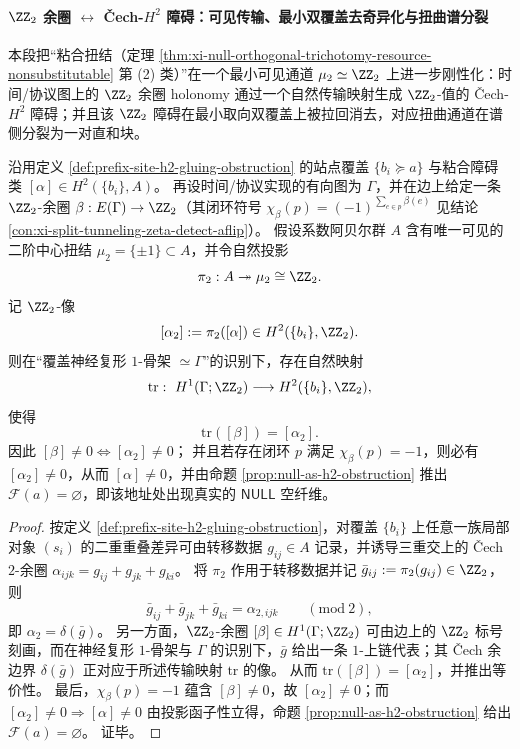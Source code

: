 
\paragraph{\texorpdfstring{$\ZZ_2$}{Z/2} 余圈 \texorpdfstring{$\leftrightarrow$}{<->} Čech-\texorpdfstring{$H^2$}{H2} 障碍：可见传输、最小双覆盖去奇异化与扭曲谱分裂}\label{par:xi-null-z2-cech-transfer-doublecover}
本段把“粘合扭结（定理 \ref{thm:xi-null-orthogonal-trichotomy-resource-nonsubstitutable} 第 (2) 类）”在一个最小可见通道 \(\mu_2\simeq\ZZ_2\) 上进一步刚性化：时间/协议图上的 \(\ZZ_2\) 余圈 holonomy 通过一个自然传输映射生成 \(\ZZ_2\)-值的 Čech-\(H^2\) 障碍；并且该 \(\ZZ_2\) 障碍在最小取向双覆盖上被拉回消去，对应扭曲通道在谱侧分裂为一对直和块。

\begin{theorem}\label{thm:xi-null-z2-cech-transfer-bockstein}
沿用定义 \ref{def:prefix-site-h2-gluing-obstruction} 的站点覆盖 \(\{b_i\succeq a\}\) 与粘合障碍类 \([\alpha]\in H^2(\{b_i\},A)\)。
再设时间/协议实现的有向图为 \(\Gamma\)，并在边上给定一条 \(\ZZ_2\)-余圈 \(\beta:E(\Gamma)\to\ZZ_2\)（其闭环符号
\(\chi_\beta(p)=(-1)^{\sum_{e\in p}\beta(e)}\)
见结论 \ref{con:xi-split-tunneling-zeta-detect-aflip}）。
假设系数阿贝尔群 \(A\) 含有唯一可见的二阶中心扭结 \(\mu_2=\{\pm1\}\subset A\)，并令自然投影
\[
\pi_2:A\twoheadrightarrow \mu_2\cong \ZZ_2.
\]
记 \(\ZZ_2\)-像
\[
[\alpha_2]:=\pi_2([\alpha])\in H^2(\{b_i\},\ZZ_2).
\]
则在“覆盖神经复形 \(1\)-骨架 \(\simeq \Gamma\)”的识别下，存在自然映射
\[
\mathrm{tr}:\ H^1(\Gamma;\ZZ_2)\longrightarrow H^2(\{b_i\},\ZZ_2),
\]
使得
\[
\mathrm{tr}([\beta])=[\alpha_2].
\]
因此
\(
[\beta]\neq 0 \iff [\alpha_2]\neq 0
\)；
并且若存在闭环 \(p\) 满足 \(\chi_\beta(p)=-1\)，则必有 \([\alpha_2]\neq 0\)，从而 \([\alpha]\neq 0\)，并由命题 \ref{prop:null-as-h2-obstruction} 推出 \(\mathscr{F}(a)=\varnothing\)，即该地址处出现真实的 \(\mathsf{NULL}\) 空纤维。
\end{theorem}

\begin{proof}
按定义 \ref{def:prefix-site-h2-gluing-obstruction}，对覆盖 \(\{b_i\}\) 上任意一族局部对象 \((s_i)\) 的二重重叠差异可由转移数据 \(g_{ij}\in A\) 记录，并诱导三重交上的 Čech \(2\)-余圈
\(
\alpha_{ijk}=g_{ij}+g_{jk}+g_{ki}
\)。
将 \(\pi_2\) 作用于转移数据并记 \(\bar g_{ij}:=\pi_2(g_{ij})\in\ZZ_2\)，则
\[
\bar g_{ij}+\bar g_{jk}+\bar g_{ki}=\alpha_{2,ijk}\qquad(\mathrm{mod}\ 2),
\]
即 \(\alpha_2=\delta(\bar g)\)。
另一方面，\(\ZZ_2\)-余圈 \([\beta]\in H^1(\Gamma;\ZZ_2)\) 可由边上的 \(\ZZ_2\) 标号刻画，而在神经复形 \(1\)-骨架与 \(\Gamma\) 的识别下，\(\bar g\) 给出一条 \(1\)-上链代表；其 Čech 余边界 \(\delta(\bar g)\) 正对应于所述传输映射 \(\mathrm{tr}\) 的像。
从而 \(\mathrm{tr}([\beta])=[\alpha_2]\)，并推出等价性。
最后，\(\chi_\beta(p)=-1\) 蕴含 \([\beta]\neq 0\)，故 \([\alpha_2]\neq 0\)；而 \([\alpha_2]\neq 0\Rightarrow [\alpha]\neq 0\) 由投影函子性立得，命题 \ref{prop:null-as-h2-obstruction} 给出 \(\mathscr{F}(a)=\varnothing\)。
证毕。
\end{proof}

